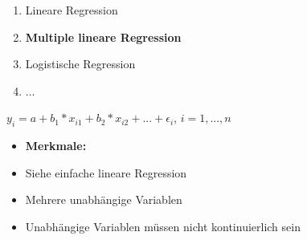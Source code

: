 \documentclass[aspectratio=169, journal, x11names, unknownkeysallowed, hyperref={colorlinks,
linkcolor = SS2,
urlcolor  = F3,
citecolor = F3,
anchorcolor = A4}, 12pt]{beamer}
\begin{document}
    \begin{frame}[t]
      \begin{minipage}{0.45\textwidth}
        \begin{enumerate}
          \item Lineare Regression
          \item \textbf{Multiple lineare Regression}
          \item Logistische Regression
          \item ...
        \end{enumerate}
    \end{minipage}%
    \begin{minipage}[t]{0.45\textwidth}
      \begin{tcolorbox}
        \begin{center}
          $y_i = a + b_1 * x_{i1} + b_2 * x_{i2} + ... + \epsilon_i$, $i = 1, ..., n$
          \end{center}
        \end{tcolorbox}
      \begin{itemize}
        \item[] \textbf{Merkmale:}
        \item Siehe einfache lineare Regression
        \item Mehrere unabhängige Variablen
        \item Unabhängige Variablen müssen nicht kontinuierlich sein
      \end{itemize}
    \end{minipage}
    \end{frame}
\end{document}
